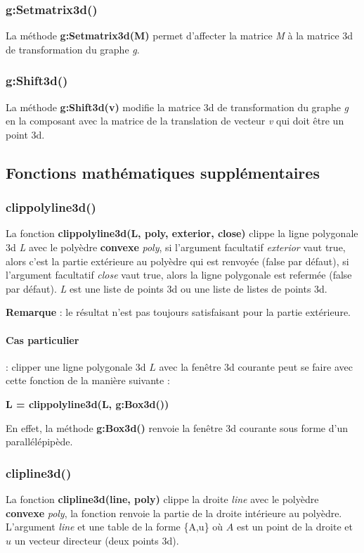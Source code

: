 \subsubsection{g:Setmatrix3d()}
La méthode \textbf{g:Setmatrix3d(M)} permet d'affecter la matrice \emph M à la matrice 3d de transformation du graphe \emph g.

\subsubsection{g:Shift3d()}
La méthode \textbf{g:Shift3d(v)} modifie la matrice 3d de transformation du graphe \emph g en la composant avec la matrice de la translation de vecteur \emph{v} qui doit être un point 3d.

\subsection{Fonctions mathématiques supplémentaires}

\subsubsection{clippolyline3d()}
La fonction \textbf{clippolyline3d(L, poly, exterior, close)} clippe la ligne polygonale 3d \emph{L} avec le polyèdre \textbf{convexe} \emph{poly}, si l'argument facultatif \emph{exterior} vaut true, alors c'est la partie extérieure au polyèdre qui est renvoyée (false par défaut), si l'argument facultatif \emph{close} vaut true, alors la ligne polygonale est refermée (false par défaut). \emph{L} est une liste de points 3d ou une liste de listes de points 3d.\par
\textbf{Remarque} : le résultat n'est pas toujours satisfaisant pour la partie extérieure.

\paragraph{Cas particulier} : clipper une ligne polygonale 3d $L$ avec la fenêtre 3d courante peut se faire avec cette fonction de la manière suivante :

\begin{center}
\textbf{L = clippolyline3d(L, g:Box3d())}
\end{center}

En effet, la méthode \textbf{g:Box3d()} renvoie la fenêtre 3d courante sous forme d'un parallélépipède.


\subsubsection{clipline3d()}
La fonction \textbf{clipline3d(line, poly)} clippe la droite \emph{line} avec le polyèdre \textbf{convexe} \emph{poly}, la fonction renvoie la partie de la droite intérieure au polyèdre. L'argument \emph{line} et une table de la forme \{A,u\} où $A$ est un point de la droite et $u$ un vecteur directeur (deux points 3d).

